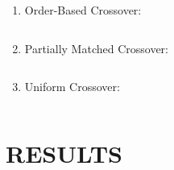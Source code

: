 \documentclass[12pt,a4paper]{article}
\begin{document}
\begin{enumerate}
	\item Order-Based Crossover:
	\begin{lstlisting}[language=Python]
	\end{lstlisting}

	\item Partially Matched Crossover:
	\begin{lstlisting}[language=Python]
	\end{lstlisting}

	\item Uniform Crossover:
	\begin{lstlisting}[language=Python]
	\end{lstlisting}

	\end{enumerate}
	\section{\large RESULTS}
		
	
\end{document}
